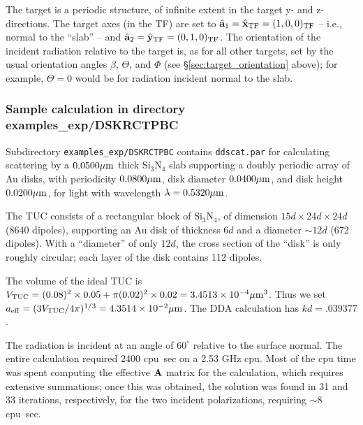 	The target
	is a periodic structure, of infinite extent in the target
	y- and z- directions.
	The target axes (in the TF) 
	are set to ${\hat{\bf a}}_1 = \hat{\bf x}_{\rm TF} = (1,0,0)_{\rm TF}$ --
	i.e., normal to the ``slab'' -- and
	${\hat{\bf a}}_2 = \hat{\bf y}_{\rm TF}= (0,1,0)_{\rm TF}$.
	The orientation of the incident radiation relative to the target
	is, as for all other targets, set by the usual orientation
	angles $\beta$, $\Theta$, and $\Phi$ 
	(see \S\ref{sec:target_orientation} above); for example,
	$\Theta=0$ would be for radiation incident normal to the slab.


\subsubsection{\bf Sample calculation in directory examples\_exp/DSKRCTPBC}

Subdirectory {\tt examples\_exp/DSKRCTPBC} contains {\tt ddscat.par} for
calculating scattering by a $0.0500{\mu{\rm m}}$ thick Si$_3$N$_4$ slab supporting
a doubly periodic array of Au disks, with periodicity $0.0800{\mu{\rm m}}$,
disk diameter $0.0400{\mu{\rm m}}$, and disk height $0.0200{\mu{\rm m}}$, for
light with wavelength $\lambda=0.5320{\mu{\rm m}}$.

The TUC consists of a rectangular block of Si$_3$N$_4$, of dimension
$15d\times24d\times24d$ (8640 dipoles), 
supporting an Au disk of thickness $6d$ and
a diameter $\sim$$12d$ (672 dipoles).  With a ``diameter'' of only $12d$,
the cross section of the ``disk'' is only roughly circular; each layer
of the disk contains 112 dipoles.

The volume of the ideal TUC is $V_{\rm TUC}=(0.08)^2\times0.05 + \pi (0.02)^2\times0.02=3.4513\times10^{-4}{\mu{\rm m}}^3$.  Thus we set ${a}_{\rm eff}=(3V_{\rm TUC}/4\pi)^{1/3}=4.3514\times10^{-2}{\mu{\rm m}}$.
The DDA calculation has $kd=.039377$.

The radiation is incident at an angle of $60^\circ$ relative to the
surface normal.
The entire calculation required 2400 cpu~sec on a 2.53 GHz cpu.
Most of the cpu time was spent computing the effective ${\bf A}$ matrix
for the calculation, which requires extensive summations; 
once this was obtained, the solution was found
in 31 and 33 iterations, respectively, for the two incident polarizations,
requiring $\sim$8 cpu~sec.

